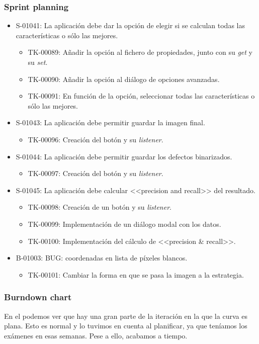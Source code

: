 \subsubsection*{Sprint planning}
\begin{itemize}
 \item S-01041: La aplicación debe dar la opción de elegir si se calculan todas las características o sólo las mejores.
  \begin{itemize}
   \item TK-00089: Añadir la opción al fichero de propiedades, junto con su \emph{get} y su \emph{set}.
   \item TK-00090: Añadir la opción al diálogo de opciones avanzadas.
   \item TK-00091: En función de la opción, seleccionar todas las características o sólo las mejores.
  \end{itemize}
 \item S-01043: La aplicación debe permitir guardar la imagen final.
  \begin{itemize}
   \item TK-00096: Creación del botón y su \textit{listener}.
  \end{itemize}
  \item S-01044: La aplicación debe permitir guardar los defectos binarizados.
  \begin{itemize}
   \item TK-00097: Creación del botón y su \textit{listener}.
  \end{itemize}
  \item S-01045: La aplicación debe calcular <<precision and recall>> del resultado.
  \begin{itemize}
   \item TK-00098: Creación de un botón y su \textit{listener}.
   \item TK-00099: Implementación de un diálogo modal con los datos.
   \item TK-00100: Implementación del cálculo de <<precision \& recall>>.
  \end{itemize}
 \item B-01003: BUG: coordenadas en lista de píxeles blancos.
  \begin{itemize}
   \item TK-00101: Cambiar la forma en que se pasa la imagen a la estrategia.
  \end{itemize}
\end{itemize}


\subsubsection*{Burndown chart}
En el \burndownchart{}  podemos ver que hay una gran parte de la iteración en la que la curva es plana. Esto es normal y lo tuvimos en cuenta al planificar, ya que teníamos los exámenes en esas semanas. Pese a ello, acabamos a tiempo.

